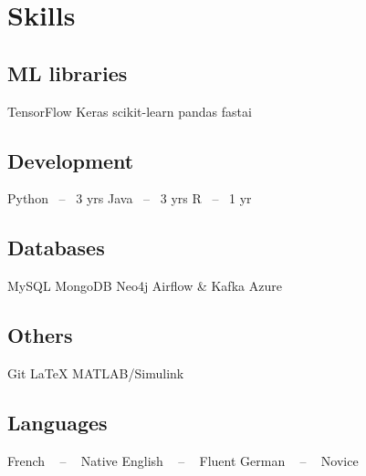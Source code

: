 \section{Skills}
\subsection{ML libraries}
TensorFlow
Keras
scikit-learn
pandas
fastai
~
\subsection{Development}
Python~ – ~3 yrs
Java~ – ~3 yrs
R~ – ~1 yr
~
\subsection{Databases}
MySQL
MongoDB
Neo4j
Airflow \& Kafka
Azure
~
\subsection{Others}
Git
\LaTeX
MATLAB/Simulink
~
\subsection{Languages}
French ~ – ~ Native
English ~ – ~ Fluent
German ~ – ~ Novice%